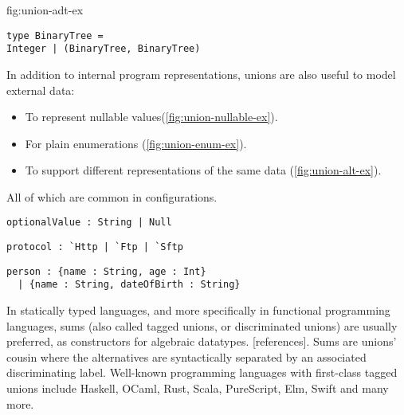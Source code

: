 \documentclass[sigplan,10pt,review,anonymous]{acmart}
\newcommand{\unsure}[2][1=]{}
\newcommand{\change}[2]{}
\begin{document}
\change{These next few labels need to be inside figures,
they are not working}
\label{fig:union-adt-ex}
\begin{lstlisting}[title={Tree-like data structure}]
type BinaryTree =
Integer | (BinaryTree, BinaryTree)
\end{lstlisting}


In addition to internal program representations, unions are also useful to model
external data:
\begin{itemize}
    \item To represent nullable values(\ref{fig:union-nullable-ex}).
    \item For plain enumerations (\ref{fig:union-enum-ex}).
    \item To support different representations of the same data
        (\ref{fig:union-alt-ex}).
\end{itemize}
All of which are common in configurations.

\label{fig:union-nullable-ex}
\begin{lstlisting}[title={Nullable values}]
optionalValue : String | Null
\end{lstlisting}

\label{fig:union-enum-ex}
\begin{lstlisting}[title={Plain enumeration}]
protocol : `Http | `Ftp | `Sftp
\end{lstlisting}

\label{fig:union-alt-ex}
\begin{lstlisting}[title={Alternative representations}]
person : {name : String, age : Int}
  | {name : String, dateOfBirth : String}
\end{lstlisting}

In statically typed languages, and more specifically in functional programming
languages, sums (also called tagged unions, or discriminated unions) are usually
preferred, as constructors for algebraic datatypes. \unsure{This is a very
    misleading statement at best. Sums are "tagged union" sure, but that refers
to an encoding a sums with unions, certainly not an encoding of unions with
sums!} [references]. Sums are unions' cousin where the alternatives are
syntactically separated by an associated discriminating label. Well-known
programming languages with first-class tagged unions include Haskell, OCaml,
Rust, Scala, PureScript, Elm, Swift and many more.
\end{document}
